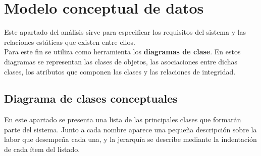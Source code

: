 \section{Modelo conceptual de datos}

Este apartado del análisis sirve para especificar los requisitos del sistema y las relaciones estáticas que
existen entre ellos. \\

Para este fin se utiliza como herramienta los \textbf{diagramas de clase}. En estos diagramas se representan
las clases de objetos, las asociaciones entre dichas clases, los atributos que componen las clases y las
relaciones de integridad.

\subsection{Diagrama de clases conceptuales}

En este apartado se presenta una lista de las principales clases que formarán parte del sistema. Junto a
cada nombre aparece una pequeña descripción sobre la labor que desempeña cada una, y la jerarquía se describe
mediante la indentación de cada ítem del listado.

